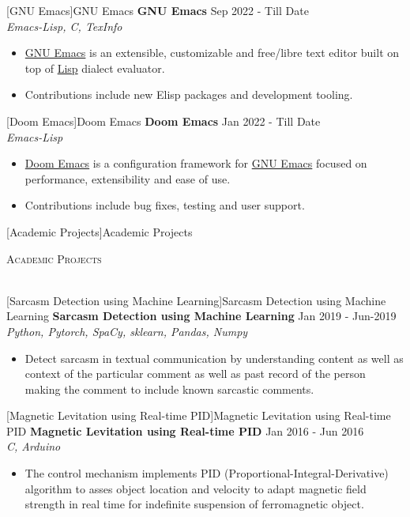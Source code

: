\documentclass[a4paper]{article}
\newcommand{\lineunder} {
    \vspace*{-8pt} \\
    \hspace*{-18pt} \hrulefill \\
}
\newcommand{\header} [1] {
    {\hspace*{-18pt}\vspace*{6pt} \textsc{#1}}
    \vspace*{-6pt} \lineunder
}
\begin{document}
[GNU Emacs]{GNU Emacs}
{\textbf{GNU Emacs}} \hfill Sep 2022 - Till Date \\
\textit{Emacs-Lisp, C, TexInfo} \\
\begin{itemize}
  \item \href{https://www.gnu.org/software/emacs/}{GNU Emacs} is an extensible, customizable and free/libre text editor built on top of \href{https://en.wikipedia.org/wiki/Lisp_(programming_language)}{Lisp} dialect evaluator. \\
  \item Contributions include new Elisp packages and development tooling.\\
\end{itemize}

[Doom Emacs]{Doom Emacs}
{\textbf{Doom Emacs}} \hfill Jan 2022 - Till Date \\
\textit{Emacs-Lisp} \\
\begin{itemize}
  \item \href{https://github.com/doomemacs/doomemacs}{Doom Emacs} is a configuration framework for \href{https://www.gnu.org/software/emacs/}{GNU Emacs} focused on performance, extensibility and ease of use. \\
  \item Contributions include bug fixes, testing and user support.\\
\end{itemize}

[Academic Projects]{Academic Projects}
\header{Academic Projects}
\vspace{1mm}

[Sarcasm Detection using Machine Learning]{Sarcasm Detection using Machine Learning}
{\textbf{Sarcasm Detection using Machine Learning}} \hfill Jan 2019 - Jun-2019\\
\textit{Python, Pytorch, SpaCy, sklearn, Pandas, Numpy} \\
\begin{itemize}
  \item Detect sarcasm in textual communication by understanding content as well as context of the particular comment as well as past record of the person making the comment to include known sarcastic comments.\\
\end{itemize}

[Magnetic Levitation using Real-time PID]{Magnetic Levitation using Real-time PID}
{\textbf{Magnetic Levitation using Real-time PID}} \hfill Jan 2016 - Jun 2016\\
\textit{C, Arduino} \\
\begin{itemize}
  \item The control mechanism implements PID (Proportional-Integral-Derivative) algorithm to asses object location and velocity to adapt magnetic field strength in real time for indefinite suspension of ferromagnetic object.\\
\end{itemize}
\vspace*{2mm}
\end{document}
